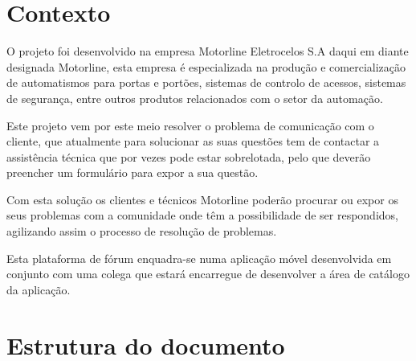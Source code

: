 

\section{Contexto}
O projeto foi desenvolvido na empresa Motorline Eletrocelos S.A daqui em diante designada Motorline, 
esta empresa é especializada na produção e comercialização de automatismos para portas e portões, 
sistemas de controlo de acessos, sistemas de segurança, entre outros produtos relacionados com o setor 
da automação.

Este projeto vem por este meio resolver o problema de comunicação com o cliente, que atualmente para 
solucionar as suas questões tem de contactar a assistência técnica que por vezes pode estar sobrelotada, 
pelo que deverão preencher um formulário para expor a sua questão.

Com esta solução os clientes e técnicos Motorline poderão procurar ou expor os seus problemas com a 
comunidade onde têm a possibilidade de ser respondidos, agilizando assim o processo de resolução de problemas.

Esta plataforma de fórum enquadra-se numa aplicação móvel desenvolvida em conjunto com uma 
colega que estará encarregue de desenvolver a área de catálogo da aplicação.

\newpage
\section{Estrutura do documento}

